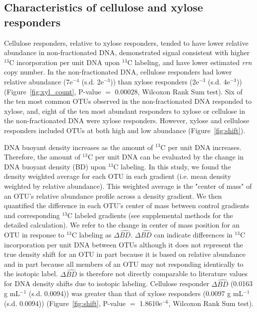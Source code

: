 \subsection{Characteristics of cellulose and xylose responders}
Cellulose responders, relative to xylose responders, tended to have lower
relative abundance in non-fractionated DNA, demonstrated signal consistent
with higher $^{13}$C incorporation per unit DNA upon $^{13}$C labeling, and
have lower estimated \textit{rrn} copy number. In the non-fractionated DNA,
cellulose responders had lower relative abundance (7e$^{-4}$ (s.d. 2e$^{-3}$))
than xylose responders (2e$^{-3}$ (s.d. 4e$^{-3}$))
(Figure~\ref{fig:xyl_count}, P-value $=$ 0.00028, Wilcoxon Rank Sum test). Six
of the ten most common OTUs observed in the non-fractionated DNA responded to
xylose, and, eight of the ten most abundant responders to xylose or cellulose
in the non-fractionated DNA were xylose responders. However, xylose
and cellulose responders included OTUs at both high and low abundance
(Figure~\ref{fig:shift}).

DNA buoyant density increases as the amount of $^{13}$C per unit DNA increases.
Therefore, the amount of $^{13}$C per unit DNA can be evaluated by the change
in DNA buoyant density (BD) upon $^{13}$C labeling. In this study, we found the
density weighted average for each OTU in each gradient (i.e. mean density
weighted by relative abundance). This weighted average is the "center of mass"
of an OTU's relative abundance profile across a density gradient. We then
quantified the difference in each OTU's center of mass between control
gradients and corresponding $^{13}$C labeled gradients (see supplemental
methods for the detailed calculation). We refer to the change in center of mass
position for an OTU in response to $^{13}$C labeling as $\Delta\hat{BD}$.
$\Delta\hat{BD}$ can indicate differences in $^{13}$C incorporation per unit
DNA between OTUs although it does not represent the true density shift for an
OTU in part because it is based on relative abundance and in part because all
members of an OTU may not responding identically to the isotopic label.
$\Delta\hat{BD}$ is therefore not directly comparable to literature values for
DNA density shifts due to isotopic labeling. Cellulose responder
$\Delta\hat{BD}$ (0.0163 g mL$^{-1}$ (s.d. 0.0094)) was greater than that of
xylose responders (0.0097 g mL$^{-1}$ (s.d. 0.0094)) (Figure~\ref{fig:shift},
P-value $=$ 1.8610e$^{-6}$, Wilcoxon Rank Sum test). 

